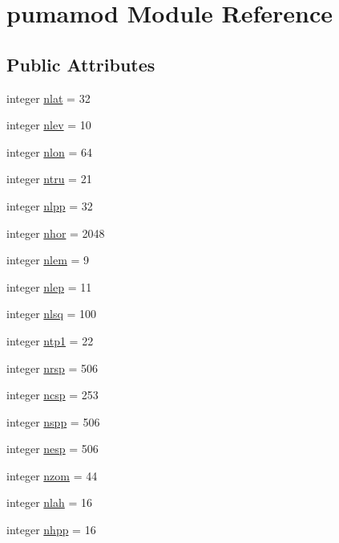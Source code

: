 \hypertarget{classpumamod}{
\section{pumamod \-Module \-Reference}
\label{classpumamod}
}
\subsection*{\-Public \-Attributes}
\begin{DoxyCompactItemize}
\item 
integer \hyperlink{classpumamod_a3411ab6d530e7e20888d7bfbe0f2bc41}{nlat} = 32
\item 
integer \hyperlink{classpumamod_a3de2d3dcdd767a858dfb9f64f129087f}{nlev} = 10
\item 
integer \hyperlink{classpumamod_ac6cf2d31f555e462d15dfb23afd6a035}{nlon} = 64
\item 
integer \hyperlink{classpumamod_ae619e60539d80754ec4298f0fdc6724e}{ntru} = 21
\item 
integer \hyperlink{classpumamod_aee2e0766afdaa439ad0c79c10289b723}{nlpp} = 32
\item 
integer \hyperlink{classpumamod_a8bbbf57ba00e0a60edcb5f55b6c4881f}{nhor} = 2048
\item 
integer \hyperlink{classpumamod_a09581b8e97e093efc8ec479657f637bf}{nlem} = 9
\item 
integer \hyperlink{classpumamod_a05c1015570a9ac8a74602db90dfe9113}{nlep} = 11
\item 
integer \hyperlink{classpumamod_a44c4ca4a17cfda8c24d18f105166817f}{nlsq} = 100
\item 
integer \hyperlink{classpumamod_a3f387b7be204f54ea75b61f0be441430}{ntp1} = 22
\item 
integer \hyperlink{classpumamod_ae42b0619616180a024fc68c07e639f43}{nrsp} = 506
\item 
integer \hyperlink{classpumamod_a40c76f46506eb6542ad7ccbed8dd35ba}{ncsp} = 253
\item 
integer \hyperlink{classpumamod_a21fc1a421eaa018055d3e84704d8e594}{nspp} = 506
\item 
integer \hyperlink{classpumamod_a16c9776cd5fc9e03115b811020c87c5a}{nesp} = 506
\item 
integer \hyperlink{classpumamod_a92c91c6f6d1af535729b74c33c515e87}{nzom} = 44
\item 
integer \hyperlink{classpumamod_a6f175a2b93a1284714be362b3a1d6f39}{nlah} = 16
\item 
integer \hyperlink{classpumamod_a5ac284ed19ba1f7367a214afe2193c1e}{nhpp} = 16

\end{DoxyCompactItemize}
